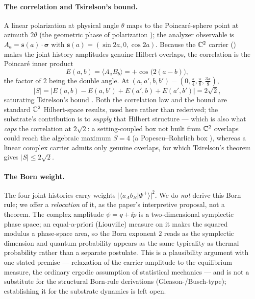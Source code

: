 \paragraph{The correlation and Tsirelson's bound.}
A linear polarization at physical angle $\theta$ maps to the Poincar\'e-sphere point at azimuth
$2\theta$ (the geometric phase of polarization \citep{Pancharatnam1956,Berry1984}); the analyzer
observable is $A_a=\bm{s}(a)\!\cdot\!\bm{\sigma}$ with $\bm{s}(a)=(\sin 2a,0,\cos 2a)$. Because the
$\mathbb{C}^{2}$ carrier () makes the joint history amplitudes genuine Hilbert overlaps, the
correlation is the Poincar\'e inner product
\begin{equation}
  E(a,b)=\langle A_a B_b\rangle = +\cos\!\bigl(2(a-b)\bigr),
  \label{eq:cos-correlation}
\end{equation}
the factor of $2$ being the double angle. At $(a,a',b,b')=(0,\tfrac\pi4,\tfrac\pi8,\tfrac{3\pi}8)$,
\begin{equation}
  \lvert S\rvert=\bigl\lvert E(a,b)-E(a,b')+E(a',b)+E(a',b')\bigr\rvert = 2\sqrt 2 ,
  \label{eq:chsh-tsirelson}
\end{equation}
saturating Tsirelson's bound \citep{Tsirelson1980}. Both the correlation law and the bound are
standard $\mathbb{C}^{2}$ Hilbert-space results, used here rather than rederived; the substrate's
contribution is to \emph{supply} that Hilbert structure --- which is also what \emph{caps} the
correlation at $2\sqrt2$: a setting-coupled box not built from $\mathbb{C}^{2}$ overlaps could reach the
algebraic maximum $S=4$ (a Popescu--Rohrlich box \citep{PopescuRohrlich1994}), whereas a linear
complex carrier admits only genuine overlaps, for which Tsirelson's theorem gives
$\lvert S\rvert\le 2\sqrt2$.

\paragraph{The Born weight.}
The four joint histories carry weights $\lvert\langle a_A b_B\vert\Phi^+\rangle\rvert^2$. We do
\emph{not} derive this Born rule; we offer a \emph{relocation} of it, as the paper's interpretive
proposal, not a theorem. The complex amplitude $\psi=q+\ii p$ is a two-dimensional symplectic phase
space; an equal-a-priori (Liouville) measure on it makes the squared modulus a phase-space area, so
the Born exponent $2$ reads as the symplectic dimension and quantum probability appears as the same
typicality as thermal probability rather than a separate postulate. This is a plausibility argument
with one stated premise --- relaxation of the carrier amplitude to the equilibrium measure, the
ordinary ergodic assumption of statistical mechanics --- and is not a substitute for the structural
Born-rule derivations (Gleason-/Busch-type); establishing it for the substrate dynamics is left
open.

